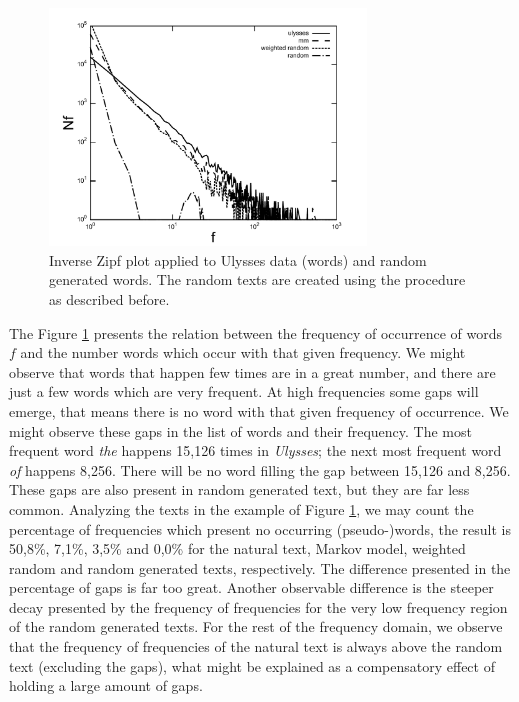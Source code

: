 \begin{figure}[h!]
\centering
\includegraphics[width=0.75\textwidth]{images/inverse_zipf_ulysses_words.pdf}
\caption{Inverse Zipf plot applied to Ulysses data (words) and random generated words. The random texts
are created using the procedure as described before.}
\label{fig:inverse_zipf_ulysses_words}
\end{figure} 

The Figure \ref{fig:inverse_zipf_ulysses_words} presents the relation between the frequency of occurrence
of words $f$ and the number words which occur with that given frequency. We might observe that
words that happen few times are in a great number, and there are just a few words which are
very frequent. At high frequencies some gaps will emerge, that means there is no word with that
given frequency of occurrence. We might observe these gaps in the list of words and their frequency.
The most frequent word \textit{the} happens 15,126 times in \textit{Ulysses}; the next most frequent
word \textit{of} happens 8,256. There will be no word filling the gap between 15,126 and 8,256.
These gaps are also present in random generated text, but they are far less common.
Analyzing the texts in the example of Figure \ref{fig:inverse_zipf_ulysses_words}, we may
count the percentage of frequencies which present no occurring (pseudo-)words, the result is
50,8\%, 7,1\%, 3,5\% and 0,0\% for the natural text, Markov model, weighted random and random generated
texts, respectively. The difference presented in the percentage of gaps is far too great. Another
observable difference is the steeper decay presented by the frequency of frequencies for the very low
frequency region of the random generated texts. For the rest of the frequency domain, we observe that
the frequency of frequencies of the natural text is always above the random text (excluding the gaps), what
might be explained as a compensatory effect of holding a large amount of gaps. 

